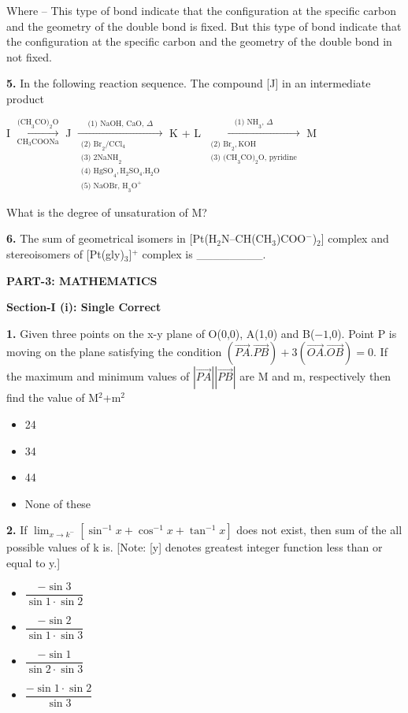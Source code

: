 \documentclass[10pt,twocolumn]{extarticle}
\newenvironment{qoptions}{\begin{itemize}[leftmargin=1.8em,itemsep=2pt,topsep=2pt,label={}]}{\end{itemize}}
\newcommand{\opt}[2]{\item[({#1})] {#2}}
\newcommand{\sectionhdr}[1]{\par\vspace{4pt}\noindent\textbf{\large #1}\par\vspace{2pt}}
\newcommand{\subsectionhdr}[1]{\par\vspace{3pt}\noindent\textbf{#1}\par\vspace{2pt}}
\begin{document}
Where --
This type of bond indicate that the configuration at the specific carbon and the geometry of the double bond is fixed.
But this type of bond indicate that the configuration at the specific carbon and the geometry of the double bond in not fixed.

\textbf{5.} In the following reaction sequence. The compound [J] in an intermediate product

I $\xrightarrow[\text{CH}_3\text{COONa}]{\text{(CH}_3\text{CO)}_2\text{O}}$ J $\xrightarrow[\substack{\text{(2) Br}_2/\text{CCl}_4\\\text{(3) 2NaNH}_2\\\text{(4) HgSO}_4,\text{H}_2\text{SO}_4.\text{H}_2\text{O}\\\text{(5) NaOBr, H}_3\text{O}^+}]{\text{(1) NaOH, CaO, }\Delta}$ K + L $\xrightarrow[\substack{\text{(2) Br}_2,\text{KOH}\\\text{(3) (CH}_3\text{CO)}_2\text{O, pyridine}}]{\text{(1) NH}_3,\,\Delta}$ M

What is the degree of unsaturation of M?

\textbf{6.} The sum of geometrical isomers in [Pt(H$_2$N--CH(CH$_3$)COO$^-$)$_2$] complex and stereoisomers of [Pt(gly)$_3$]$^+$ complex is \_\_\_\_\_\_\_\_.

\sectionhdr{PART-3: MATHEMATICS}
\subsectionhdr{Section-I (i): Single Correct}

\textbf{1.} Given three points on the x-y plane of O(0,0), A(1,0) and B($-1$,0). Point P is moving on the plane satisfying the condition $(\overrightarrow{PA}.\overrightarrow{PB})+3(\overrightarrow{OA}.\overrightarrow{OB})=0$. If the maximum and minimum values of $|\overrightarrow{PA}||\overrightarrow{PB}|$ are M and m, respectively then find the value of M$^2$+m$^2$

\begin{qoptions}
\opt{A}{24}
\opt{B}{34}
\opt{C}{44}
\opt{D}{None of these}
\end{qoptions}

\textbf{2.} If $\displaystyle\lim_{x\to k^-}[\sin^{-1}x+\cos^{-1}x+\tan^{-1}x]$ does not exist, then sum of the all possible values of k is.
[Note: [y] denotes greatest integer function less than or equal to y.]

\begin{qoptions}
\opt{A}{$\dfrac{-\sin3}{\sin1\cdot\sin2}$}
\opt{B}{$\dfrac{-\sin2}{\sin1\cdot\sin3}$}
\opt{C}{$\dfrac{-\sin1}{\sin2\cdot\sin3}$}
\opt{D}{$\dfrac{-\sin1\cdot\sin2}{\sin3}$}
\end{qoptions}
\end{document}
